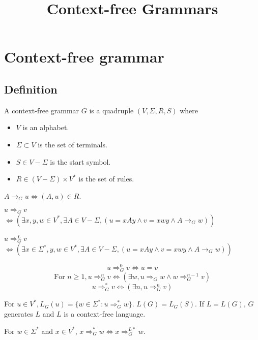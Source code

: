 

\title{Context-free Grammars}



\initAfterBeginDocument{}


\section{Context-free grammar}

\subsection{Definition}

\begin{definition}
A context-free grammar $G$ is a quadruple $(V, \Sigma, R, S)$ where
\begin{itemize}
\item $V$ is an alphabet.
\item $\Sigma \subset V$ is the set of terminals.
\item $S \in V-\Sigma$ is the start symbol.
\item $R \in (V-\Sigma) \times V^*$ is the set of rules.
\end{itemize}
\end{definition}

\begin{definition}[$\rightarrow_G$]
$A \rightarrow_G u \iff (A, u) \in R$.
\end{definition}
\begin{definition}[$\Rightarrow_G$]
$u \Rightarrow_G v$\\
$\iff (\exists x,y,w \in V^*, \exists A \in V - \Sigma,
(u = xAy \wedge v = xwy \wedge A \rightarrow_G w))$
\end{definition}
\begin{definition}[$\Rightarrow_G^L$]
$u \Rightarrow_G^L v$\\
$\iff (\exists x \in \Sigma^*, y, w \in V^*, \exists A \in V - \Sigma,
(u = xAy \wedge v = xwy \wedge A \rightarrow_G w))$
\end{definition}
\begin{definition}[$\Rightarrow_G^n$]
\[ u \Rightarrow_G^0 v \iff u = v \]
\[ \textrm{For } n \ge 1, u \Rightarrow_G^n v \iff (\exists w, u \Rightarrow_G w \wedge w \Rightarrow_G^{n-1} v) \]
\[ u \Rightarrow_G^* v \iff (\exists n, u \Rightarrow_G^n v) \]
\end{definition}
\begin{definition}
For $u \in V^*, L_G(u) = \{w \in \Sigma^*: u \Rightarrow_G^* w \}$.
$L(G) = L_G(S)$.
If $L = L(G)$, $G$ generates $L$ and $L$ is a context-free language.
\end{definition}
\begin{theorem}
For $w \in \Sigma^*$ and $x \in V^*$, $x \Rightarrow_G^* w \iff x \Rightarrow _G^{L*} w$.
\end{theorem}

